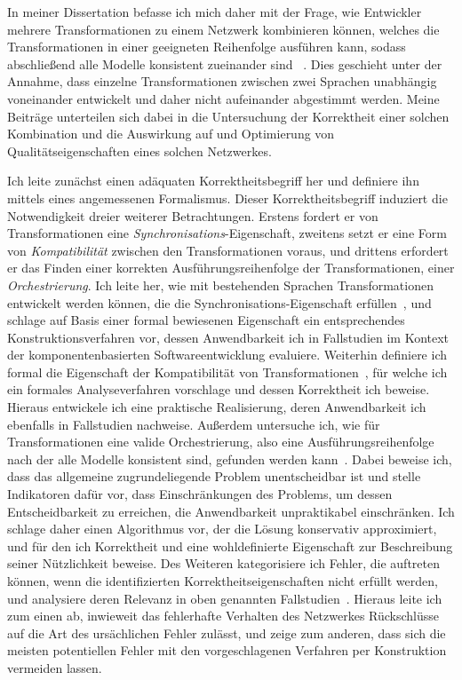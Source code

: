 \documentclass[a4paper,deutsch,CS,11pt,unnummeriert]{KITbrief}
\newcommand\owncite[2][]{%
    \cite[#1]{#2}%
    \addtocategory{ownpublications}{#2}%
}
\begin{document}
In meiner Dissertation befasse ich mich daher mit der Frage, wie Entwickler mehrere Transformationen zu einem Netzwerk kombinieren können, welches die Transformationen in einer geeigneten Reihenfolge ausführen kann, sodass abschließend alle Modelle konsistent zueinander sind~\owncite{klare2020Vitruv-JSS,klare2018docsym}.
Dies geschieht unter der Annahme, dass einzelne Transformationen zwischen zwei Sprachen unabhängig voneinander entwickelt und daher nicht aufeinander abgestimmt werden.
Meine Beiträge unterteilen sich dabei in die Untersuchung der Korrektheit einer solchen Kombination und die Auswirkung auf und Optimierung von Qualitätseigenschaften eines solchen Netzwerkes.

Ich leite zunächst einen adäquaten Korrektheitsbegriff her und definiere ihn mittels eines angemessenen Formalismus.
Dieser Korrektheitsbegriff induziert die Notwendigkeit dreier weiterer Betrachtungen. Erstens fordert er von Transformationen eine \emph{Synchronisations}-Eigenschaft, zweitens setzt er eine Form von \emph{Kompatibilität} zwischen den Transformationen voraus, und drittens erfordert er das Finden einer korrekten Ausführungsreihenfolge der Transformationen, einer \emph{Orchestrierung}.
Ich leite her, wie mit bestehenden Sprachen Transformationen entwickelt werden können, die die Synchronisations-Eigenschaft erfüllen~\cite{klare2019icmt}, und schlage auf Basis einer formal bewiesenen Eigenschaft ein entsprechendes Konstruktionsverfahren vor, dessen Anwendbarkeit ich in Fallstudien im Kontext der komponentenbasierten Softwareentwicklung evaluiere.
Weiterhin definiere ich formal die Eigenschaft der Kompatibilität von Transformationen~\cite{klare2020compatibility-report}, für welche ich ein formales Analyseverfahren vorschlage und dessen Korrektheit ich beweise. Hieraus entwickele ich eine praktische Realisierung, deren Anwendbarkeit ich ebenfalls in Fallstudien nachweise.
Außerdem untersuche ich, wie für Transformationen eine valide Orchestrierung, also eine Ausführungsreihenfolge nach der alle Modelle konsistent sind, gefunden werden kann~\cite{gleitze2020orchestration}.
Dabei beweise ich, dass das allgemeine zugrundeliegende Problem unentscheidbar ist und stelle Indikatoren dafür vor, dass Einschränkungen des Problems, um dessen Entscheidbarkeit zu erreichen, die Anwendbarkeit unpraktikabel einschränken.
Ich schlage daher einen Algorithmus vor, der die Lösung konservativ approximiert, und für den ich Korrektheit und eine wohldefinierte Eigenschaft zur Beschreibung seiner Nützlichkeit beweise. %
Des Weiteren kategorisiere ich Fehler, die auftreten können, wenn die identifizierten Korrektheitseigenschaften nicht erfüllt werden, und analysiere deren Relevanz in oben genannten Fallstudien~\cite{klare2019icmt}.
Hieraus leite ich zum einen ab, inwieweit das fehlerhafte Verhalten des Netzwerkes Rückschlüsse auf die Art des ursächlichen Fehler zulässt, und zeige zum anderen, dass sich die meisten potentiellen Fehler mit den vorgeschlagenen Verfahren per Konstruktion vermeiden lassen.
\end{document}
